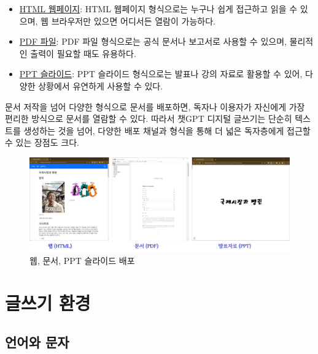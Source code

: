 \documentclass[
  letterpaper,
]{book}
\providecommand{\tightlist}{%
  \setlength{\itemsep}{0pt}\setlength{\parskip}{0pt}}\usepackage{longtable,booktabs,array}
\begin{document}
\begin{itemize}
\tightlist
\item
  \href{https://statkclee.quarto.pub/writing-penguin/01_movie.html}{HTML
  웹페이지}: HTML 웹페이지 형식으로는 누구나 쉽게 접근하고 읽을 수
  있으며, 웹 브라우저만 있으면 어디서든 열람이 가능하다.
\item
  \href{https://statkclee.quarto.pub/writing-penguin/02_movie_pdf.pdf}{PDF
  파일}: PDF 파일 형식으로는 공식 문서나 보고서로 사용할 수 있으며,
  물리적인 출력이 필요할 때도 유용하다.
\item
  \href{https://statkclee.quarto.pub/writing-penguin/03_movie_ppt.html\#/title-slide}{PPT
  슬라이드}: PPT 슬라이드 형식으로는 발표나 강의 자료로 활용할 수 있어,
  다양한 상황에서 유연하게 사용할 수 있다.
\end{itemize}

문서 저작을 넘어 다양한 형식으로 문서를 배포하면, 독자나 이용자가
자신에게 가장 편리한 방식으로 문서를 열람할 수 있다. 따라서 챗GPT 디지털
글쓰기는 단순히 텍스트를 생성하는 것을 넘어, 다양한 배포 채널과 형식을
통해 더 넓은 독자층에게 접근할 수 있는 장점도 크다.

\begin{figure}

{\centering \includegraphics{images/chatGPT_quarto_deploy.jpg}

}

\caption{웹, 문서, PPT 슬라이드 배포}

\end{figure}

\part{글쓰기 환경}

\hypertarget{uxc5b8uxc5b4uxc640-uxbb38uxc790}{%
\chapter{언어와 문자}\label{uxc5b8uxc5b4uxc640-uxbb38uxc790}}
\end{document}
